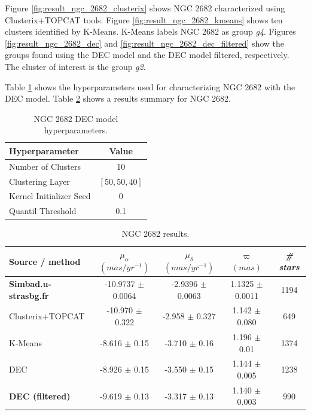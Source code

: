 \documentclass[11pt, a4paper, english]{book}
\begin{document}
\newpage

Figure \ref{fig:result_ngc_2682_clusterix} shows NGC 2682 characterized using Clusterix+TOPCAT tools.
Figure \ref{fig:result_ngc_2682_kmeans} shows ten clusters identified by K-Means.
K-Means labels NGC 2682 as group \emph{g4}.
Figures \ref{fig:result_ngc_2682_dec} and \ref{fig:result_ngc_2682_dec_filtered}
show the groups found using the DEC model and the DEC model filtered, respectively.
The cluster of interest is the group \emph{g2}.

Table \ref{tab:hyperparameters_ngc_2682} shows the hyperparameters used for characterizing NGC 2682
with the DEC model. Table \ref{tab:results_ngc_2682} shows a results summary for NGC 2682.

\vfill

\begin{table}[h]
  \begin{center}
    \begin{tabular}{l|c}
      \textbf{Hyperparameter} & \textbf{Value} \\
      \hline
      Number of Clusters & 10 \\
      Clustering Layer & $\left[ 50, 50, 40 \right]$ \\
      Kernel Initializer Seed & 0 \\
      Quantil Threshold & 0.1 \\
    \end{tabular}
    \caption{NGC 2682 DEC model hyperparameters.}
    \label{tab:hyperparameters_ngc_2682}
  \end{center}
\end{table}

\vfill

\begin{table}[h]
  \begin{center}
    \begin{tabular}{l|c|c|c|c}
      \textbf{Source / method} & \emph{$\mu_{\alpha}$ $(mas/yr^{-1})$} & \emph{$\mu_{\delta}$ $(mas/yr^{-1})$} & \emph{$\varpi$ $(mas)$} & \emph{\# stars} \\
      \hline
      \textbf{Simbad.u-strasbg.fr} & -10.9737 $\pm$ 0.0064 & -2.9396 $\pm$ 0.0063 & 1.1325 $\pm$ 0.0011 & 1194 \\
      Clusterix+TOPCAT & -10.970 $\pm$ 0.322 & -2.958 $\pm$ 0.327 & 1.142 $\pm$ 0.080 & 649 \\
      K-Means & -8.616 $\pm$ 0.15 & -3.710 $\pm$ 0.16 & 1.196 $\pm$ 0.01 & 1374 \\
      DEC & -8.926 $\pm$ 0.15 & -3.550 $\pm$ 0.15 & 1.144 $\pm$ 0.005 & 1238 \\
      \textbf{DEC (filtered)} & -9.619 $\pm$ 0.13 & -3.317 $\pm$ 0.13 & 1.140 $\pm$ 0.003 & 990 \\
    \end{tabular}
    \caption{NGC 2682 results.}
    \label{tab:results_ngc_2682}
  \end{center}
\end{table}
\end{document}
